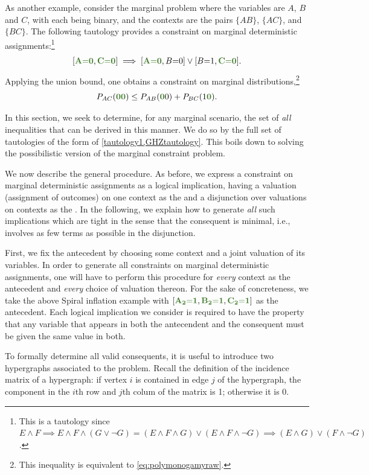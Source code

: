\documentclass[aps,english,10pt,superscriptaddress,onecolumn,twoside,longbibliography,pra,floatfix,fleqn,nofootinbib]{revtex4-1}
\newcommand*{\mgreen}[1]{{\color{OliveGreen}{\mathbf{#1}}}}
\newcommand*{\tblue}[1]{{\color{medblue}{\textbf{#1}}}}
\theoremstyle{definition}
\newcounter{example}[section]
\newcommand{\eql}{\mathord{=}}
\DeclarePairedDelimiter{\bracks}{\lbrack}{\rbrack}
\begin{document}
As another example, consider the marginal problem where the variables are $A$, $B$ and $C$, with each being binary, and the contexts are the pairs $\{AB\}$, $\{AC\}$, and $\{BC\}$.  
The following tautology provides a constraint on marginal deterministic assignments:\footnote{This is a tautology since $E \land F  \implies  E \land F \land (G \lor \lnot G) = (E \land F \land G) \lor (E\land F \land \lnot G) \implies (E \land G) \lor (F \land \lnot G)$.}
\begin{align}\label{GHZtautology}
 \bracks{\mgreen{A \eql 0}, \mgreen{C \eql 0}} \implies \bracks{\mgreen{A \eql 0}, B \eql 0} \lor \bracks{B \eql 1, \mgreen{C \eql 0}}.
\end{align}
Applying the union bound, one obtains a constraint on marginal distributions,\footnote{This inequality is equivalent to \cref{eq:polymonogamyraw}.}
\[
P_{AC}(\mgreen{0 0}) \leq P_{AB}(\mgreen{0} 0) + P_{BC}(1 \mgreen{0}).
\]

In this section, we seek to determine, for any marginal scenario, the set of \emph{all} inequalities that can be derived in this manner.  We do so by \tblue{enumerating} the full set of tautologies of the form of \cref{tautology1,GHZtautology}. This boils down to solving the possibilistic version of the marginal constraint problem.

We now describe the general procedure. As before, we express a constraint on marginal deterministic assignments as a logical implication, having a valuation (assignment of outcomes) on one context as the \tblue{antecedent} and a disjunction over valuations on contexts as the \tblue{consequent}. In the following, we explain how to generate \emph{all} such implications which are tight in the sense that the consequent is minimal, i.e., involves as few terms as possible in the disjunction. 

First, we fix the antecedent by choosing some context and a joint valuation of its variables. In order to generate all constraints on marginal deterministic assignments, one will have to perform this procedure for \emph{every} context as the antecedent and \emph{every} choice of valuation thereon. For the sake of concreteness, we take the above Spiral inflation example with $\bracks{\mgreen{A_2 \eql 1}, \mgreen{B_2 \eql 1}, \mgreen{C_2 \eql 1}}$ as the antecedent.  
Each logical implication we consider is required to have the property that any variable that appears in both the antecendent and the consequent must be given the same value in both. 

To formally determine all valid consequents, it is useful to introduce two hypergraphs associated to the problem.  Recall the definition of the incidence  matrix of a hypergraph: if vertex $i$ is contained in edge $j$ of the hypergraph, the component in the $i$th row and $j$th colum of the matrix  is 1; otherwise it is 0.  
\end{document}

